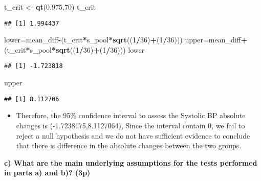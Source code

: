 \documentclass[]{article}
\newenvironment{Shaded}{\begin{snugshade}}{\end{snugshade}}
\newcommand{\DecValTok}[1]{\textcolor[rgb]{0.00,0.00,0.81}{#1}}
\newcommand{\FloatTok}[1]{\textcolor[rgb]{0.00,0.00,0.81}{#1}}
\newcommand{\KeywordTok}[1]{\textcolor[rgb]{0.13,0.29,0.53}{\textbf{#1}}}
\newcommand{\NormalTok}[1]{#1}
\newcommand{\OperatorTok}[1]{\textcolor[rgb]{0.81,0.36,0.00}{\textbf{#1}}}
\newcommand{\StringTok}[1]{\textcolor[rgb]{0.31,0.60,0.02}{#1}}
\providecommand{\tightlist}{%
  \setlength{\itemsep}{0pt}\setlength{\parskip}{0pt}}
\begin{document}
\begin{Shaded}
\begin{Highlighting}[]
\NormalTok{t_crit <-}\StringTok{ }\KeywordTok{qt}\NormalTok{(}\FloatTok{0.975}\NormalTok{,}\DecValTok{70}\NormalTok{) }
\NormalTok{t_crit}
\end{Highlighting}
\end{Shaded}

\begin{verbatim}
## [1] 1.994437
\end{verbatim}

\begin{Shaded}
\begin{Highlighting}[]
\NormalTok{lower=mean_diff}\OperatorTok{-}\NormalTok{(t_crit}\OperatorTok{*}\NormalTok{s_pool}\OperatorTok{*}\KeywordTok{sqrt}\NormalTok{((}\DecValTok{1}\OperatorTok{/}\DecValTok{36}\NormalTok{)}\OperatorTok{+}\NormalTok{(}\DecValTok{1}\OperatorTok{/}\DecValTok{36}\NormalTok{)))}
\NormalTok{upper=mean_diff}\OperatorTok{+}\NormalTok{(t_crit}\OperatorTok{*}\NormalTok{s_pool}\OperatorTok{*}\KeywordTok{sqrt}\NormalTok{((}\DecValTok{1}\OperatorTok{/}\DecValTok{36}\NormalTok{)}\OperatorTok{+}\NormalTok{(}\DecValTok{1}\OperatorTok{/}\DecValTok{36}\NormalTok{)))}
\NormalTok{lower}
\end{Highlighting}
\end{Shaded}

\begin{verbatim}
## [1] -1.723818
\end{verbatim}

\begin{Shaded}
\begin{Highlighting}[]
\NormalTok{upper}
\end{Highlighting}
\end{Shaded}

\begin{verbatim}
## [1] 8.112706
\end{verbatim}

\begin{itemize}
\tightlist
\item
  Therefore, the 95\% confidence interval to assess the Systolic BP
  absolute changes is (-1.7238175,8.1127064), Since the interval contain
  0, we fail to reject a null hypothesis and we do not have sufficient
  evidence to conclude that there is difference in the absolute changes
  between the two groups.
\end{itemize}

\textbf{c) What are the main underlying assumptions for the tests
performed in parts a) and b)? (3p)}
\end{document}

